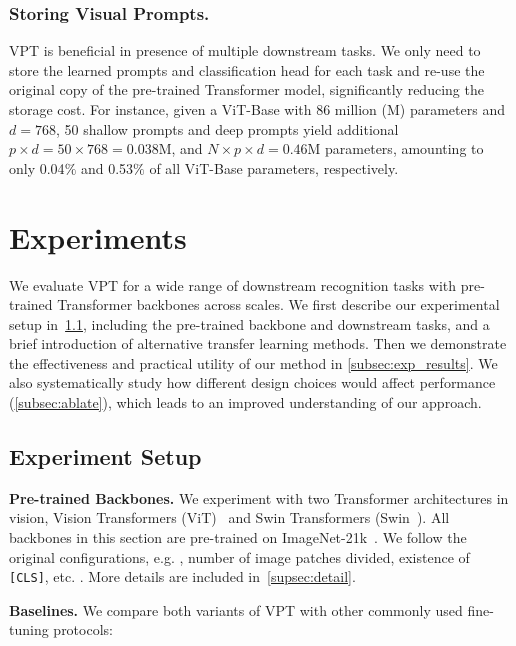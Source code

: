 \subsubsection{Storing Visual Prompts.} \textsc{VPT} is beneficial in presence of multiple downstream tasks. We only need to store the learned prompts and classification head for each task and re-use the original copy of the pre-trained Transformer model, significantly reducing the storage cost. For instance, given a ViT-Base with 86 million (M) parameters and $d=768$, 50 shallow prompts and deep prompts yield additional $p\times d=50\times 768=0.038$M, and $N\times p\times d=0.46$M parameters, amounting to only 0.04$\%$ and 0.53$\%$ of all ViT-Base parameters, respectively.

\section{Experiments}\label{sec:exp}

We evaluate VPT for a wide range of downstream recognition tasks with pre-trained Transformer backbones across scales. We first describe our experimental setup in~\ref{subsec:evalsetup}, including the pre-trained backbone and downstream tasks, and a brief introduction of alternative transfer learning methods. Then we demonstrate the effectiveness and practical utility of our method in \ref{subsec:exp_results}.
We also systematically study how different design choices would affect performance (\ref{subsec:ablate}),
which leads to an improved understanding of our approach.

\subsection{Experiment Setup}
\label{subsec:evalsetup}

\textbf{Pre-trained Backbones.} We experiment with two Transformer architectures in vision, Vision Transformers (ViT)~\cite{dosovitskiy2020vit} and Swin Transformers (Swin~\cite{liu2021swin}). All backbones in this section are pre-trained on ImageNet-21k~\cite{imagenet_cvpr09}. We follow the original configurations, e.g. , number of image patches divided, existence of \texttt{[CLS]}, etc. . More details are included in~\ref{supsec:detail}.

\textbf{Baselines.}
We compare both variants of VPT with other commonly used fine-tuning protocols:

